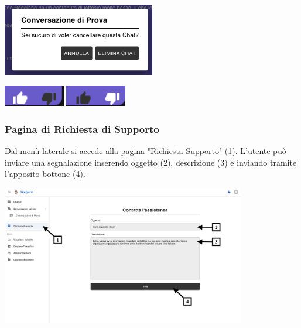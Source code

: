 \begin{center}
    \includegraphics[width=0.5\textwidth]{./img/eliminaChat.png}
    \label{fig:elimina-chat}
\end{center}

\begin{center}
    \includegraphics[width=0.2\textwidth]{./img/like.png}
    \hspace{0.05\textwidth}
    \includegraphics[width=0.2\textwidth]{./img/dislike.png}
    \label{fig:likedislike}
\end{center}

\newpage

\subsubsection{Pagina di Richiesta di Supporto}
Dal menù laterale si accede alla pagina "Richiesta Supporto" (1). L’utente può inviare una segnalazione inserendo oggetto (2), descrizione (3) e inviando tramite l’apposito bottone (4).
\begin{center}
    \includegraphics[width=0.8\textwidth]{./img/RichiestaAssistenza1.png}
    \label{fig:Pagina di Assistenza}
\end{center}

